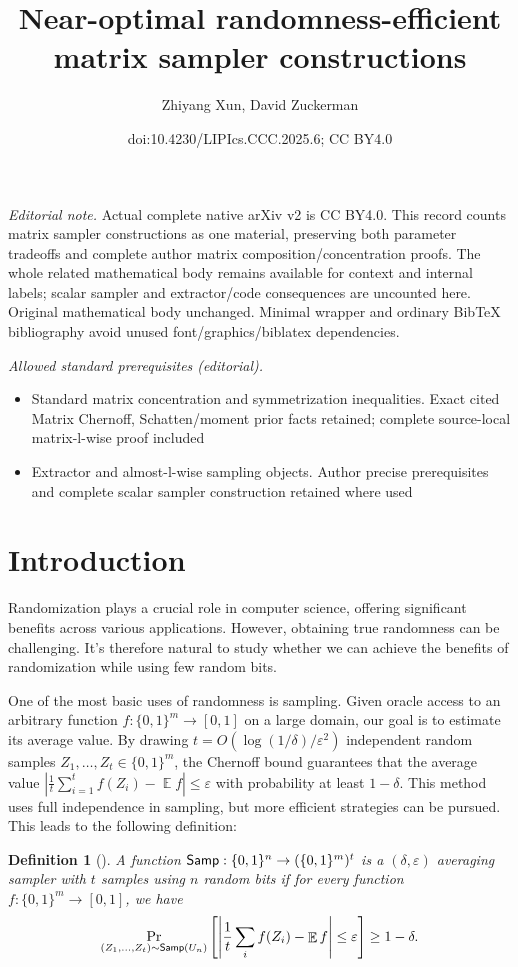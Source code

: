 \documentclass[10pt,a4paper]{article}
\title{Near-optimal randomness-efficient matrix sampler constructions}
\author{Zhiyang Xun, David Zuckerman}
\date{doi:10.4230/LIPIcs.CCC.2025.6; CC BY4.0}
\newtheorem{definition}[theorem]{Definition}
\DeclareMathOperator*{\E}{\mathbb{E}}
\newcommand{\eps}{\varepsilon}
\newcommand{\1}{\mathbbm{1}}
\newcommand{\abs}[1]{\left|#1\right| }
\newcommand{\zo}{\{0, 1\}}
\newcommand{\Smp}{\textup{\textsf{Samp}}}
\begin{document}
\maketitle
\noindent\textit{Editorial note.} Actual complete native arXiv v2 is CC BY4.0. This record counts matrix sampler constructions as one material, preserving both parameter tradeoffs and complete author matrix composition/concentration proofs. The whole related mathematical body remains available for context and internal labels; scalar sampler and extractor/code consequences are uncounted here. Original mathematical body unchanged. Minimal wrapper and ordinary BibTeX bibliography avoid unused font/graphics/biblatex dependencies.\par\medskip
\noindent\textit{Allowed standard prerequisites (editorial).}\begin{itemize}
\item Standard matrix concentration and symmetrization inequalities. Exact cited Matrix Chernoff, Schatten/moment prior facts retained; complete source-local matrix-l-wise proof included
\item Extractor and almost-l-wise sampling objects. Author precise prerequisites and complete scalar sampler construction retained where used
\end{itemize}\medskip
\section{Introduction}
Randomization plays a crucial role in computer science, offering significant benefits across various applications. However, obtaining true randomness can be challenging.
It's therefore natural to study whether we can achieve the benefits of randomization while using few random bits.

One of the most basic uses of randomness is sampling. 
Given oracle access to an arbitrary function $f: \zo^m \to [0, 1]$ on a large domain, our goal is to estimate its average value.
By drawing $t = O(\log(1/\delta)/\eps^2)$ independent random samples $Z_1, \dots, Z_t \in \zo^m$, 
the Chernoff bound guarantees that the average value $\abs{\frac{1}{t} \sum_{i=1}^t f(Z_i) - \E f} \le \eps$ with probability at least $1 - \delta$. This method uses full independence in sampling, but more efficient strategies can be pursued. This leads to the following definition:
\begin{definition}[\cite{bellare1994randomness}]
    A function $\Smp : \zo^n \to (\zo^m)^t$ is a $(\delta, \eps)$ averaging sampler with $t$ samples using $n$ random bits if for every function $f : \zo^m \to [0, 1]$, we have \[
    \Pr_{(Z_1, \dots, Z_t) \sim \Smp(U_n)}
    \left[ \abs{\frac{1}{t}  \sum_i f(Z_i) - \E f} \leq \varepsilon \right]
    \geq 1 - \delta.
    \]
\end{definition}
\end{document}
